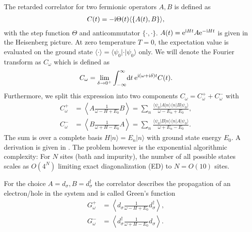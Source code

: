 The retarded correlator for two fermionic operators $A, B$ is defined as
\begin{align}
    C(t) = -\mathrm{i} \Theta(t) \langle\{A(t), B\}\rangle,
\end{align}
with the step function $\Theta$ and anticommutator $\{\cdot,\cdot\}$.
$A(t) = \mathrm{e}^{\mathrm{i} H t} A \mathrm{e}^{-\mathrm{i} H t}$ is given in the Heisenberg picture.
At zero temperature $T=0$, the expectation value is evaluated on the ground state
$\langle\cdot\rangle = \langle\psi_0 | \cdot | \psi_0\rangle$ only.
We will denote the Fourier transform as $C_\omega$ which is defined as
\begin{equation}
    C_\omega
    =
    \lim_{\delta\to 0^+}
    \int_{-\infty}^\infty\! \mathrm{d} t\> \mathrm{e}^{\mathrm{i} (\omega + \mathrm{i}\delta) t} C(t).
\end{equation}
Furthermore,
we split this expression into two components $C_\omega = C^+_\omega + C^-_\omega$ with
\begin{subequations}
    \begin{align}
        C^+_\omega
         & =
        \left\langle A \frac{1}{\omega - H + E_0} B\right\rangle
        =
        \sum_n \frac{\langle\psi_0 | A | n\rangle\langle n | B | \psi_0\rangle}{\omega - E_n + E_0}, \\
        C^-_\omega
         & =
        \left\langle B \frac{1}{\omega + H - E_0} A\right\rangle
        =
        \sum_n \frac{\langle\psi_0 | B | n\rangle\langle n | A | \psi_0\rangle}{\omega + E_n - E_0}.
    \end{align}
\end{subequations}
The sum is over a complete basis $H|n\rangle = E_n|n\rangle$ with ground state energy $E_0$.
A derivation is given in .
The problem however is the exponential algorithmic complexity:
For $N$ sites (bath and impurity), the number of all possible states scales as $O(4^N)$
limiting exact diagonalization (ED) to $N=O(10)$ sites.

For the choice $A=d_\sigma, B=d_\sigma^\dag$ the correlator describes
the propagation of an electron/hole in the system and is called Green's function
\begin{subequations}
    \begin{align}
        G^+_\omega
         & =
        \left\langle d_\sigma \frac{1}{\omega - H + E_0} d_\sigma^\dag\right\rangle,
        \label{eq:Greens-function-plus} \\
        G^-_\omega
         & =
        \left\langle d_\sigma^\dag \frac{1}{\omega + H - E_0} d_\sigma\right\rangle.
        \label{eq:Greens-function-minus}
    \end{align}
\end{subequations}

